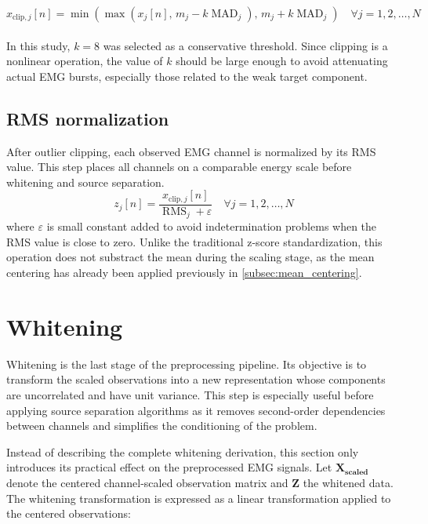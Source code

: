 \begin{equation}
x_{\text{clip},j}[n]
=
\min\left(
\max\left(x_j[n],\, m_j-k\operatorname{MAD}_j\right),
\, m_j+k\operatorname{MAD}_j
\right)
\quad \forall j=1,2,\dots,N 
\label{eq:outlier_clipping}
\end{equation} \\ \noindent
In this study, \(k=8\) was selected as a conservative threshold. Since clipping is a nonlinear operation, the value of \(k\) should be large enough to avoid attenuating actual EMG bursts, especially those related to the weak target component.
\subsection{RMS normalization}
After outlier clipping, each observed EMG channel is normalized by its RMS value. This step places all channels on a comparable energy scale before whitening and source separation.
\begin{equation}
z_j[n] =
\frac{x_{\text{clip},j}[n]}
{\operatorname{RMS}_j+\varepsilon}
\quad \forall j=1,2,\dots,N 
\label{eq:rms_scaling}
\end{equation}
where \(\varepsilon\) is small constant added to avoid indetermination problems when the RMS value is close to zero. Unlike the traditional z-score standardization, this operation does not substract the mean during the scaling stage, as the mean centering has already been applied previously in \ref{subsec:mean_centering}.

\section{Whitening}

Whitening is the last stage of the preprocessing pipeline. Its objective is to transform the scaled observations into a new representation whose components are uncorrelated and have unit variance. This step is especially useful before applying source separation algorithms as it removes second-order dependencies between channels and simplifies the conditioning of the problem.

Instead of describing the complete whitening derivation, this section only introduces its practical effect on the preprocessed EMG signals. Let $\mathbf{X_{scaled}}$ denote the centered channel-scaled observation matrix and $\mathbf{Z}$ the whitened data. The whitening transformation is expressed as a linear transformation applied to the centered observations:

